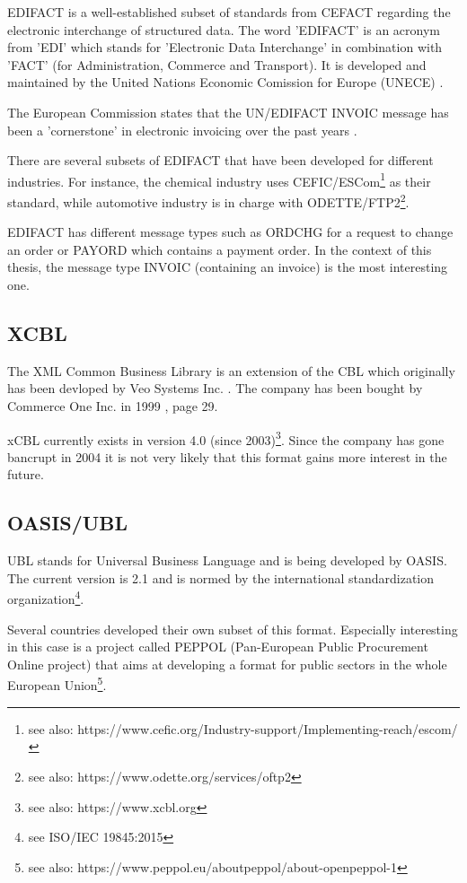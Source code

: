 EDIFACT is a well-established \cite{basware} subset of standards from CEFACT regarding the electronic interchange of structured data. The word 'EDIFACT' is an acronym from 'EDI' which stands for 'Electronic Data Interchange' in combination with 'FACT' (for Administration, Commerce and Transport). It is developed and maintained by the United Nations Economic Comission for Europe (UNECE) \cite{unece}.

The European Commission states that the UN/EDIFACT INVOIC message has been a 'cornerstone' in electronic invoicing over the past years \cite[page 14]{ec12}.

There are several subsets of EDIFACT that have been developed for different industries. For instance, the chemical industry uses CEFIC/ESCom\footnote{see also: https://www.cefic.org/Industry-support/Implementing-reach/escom/} as their standard, while automotive industry is in charge with ODETTE/FTP2\footnote{see also: https://www.odette.org/services/oftp2}.

EDIFACT has different message types such as ORDCHG for a request to change an order or PAYORD which contains a payment order. In the context of this thesis, the message type INVOIC (containing an invoice) is the most interesting one.

\subsection{XCBL}
\label{sec2.1.2}

The XML Common Business Library is an extension of the CBL which originally has been devloped by Veo Systems Inc. \cite{coverpages}. The company has been bought by Commerce One Inc. in 1999 \cite{co}, page 29. 

xCBL currently exists in version 4.0 (since 2003)\footnote{see also: https://www.xcbl.org}. Since the company has gone bancrupt in 2004 \cite{scm} it is not very likely that this format gains more interest in the future.

\subsection{OASIS/UBL}
\label{sec2.1.3}

UBL stands for Universal Business Language and is being developed by OASIS. The current version is 2.1 and is normed by the international standardization organization\footnote{see ISO/IEC 19845:2015}.

Several countries developed their own subset of this format. Especially interesting in this case is a project called PEPPOL (Pan-European Public Procurement Online project) that aims at developing a format for public sectors in the whole European Union\footnote {see also: https://www.peppol.eu/about\textunderscore peppol/about-openpeppol-1}. 

